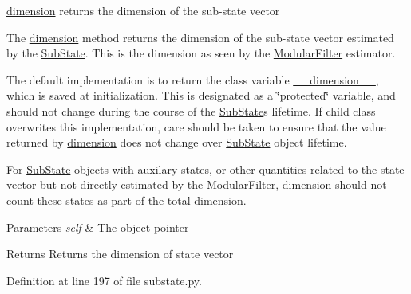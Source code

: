 \hyperlink{classmodest_1_1substates_1_1substate_1_1SubState_ab9027f6d1d7d57c47731612f519b7ee6}{dimension} returns the dimension of the sub-\/state vector 

The \hyperlink{classmodest_1_1substates_1_1substate_1_1SubState_ab9027f6d1d7d57c47731612f519b7ee6}{dimension} method returns the dimension of the sub-\/state vector estimated by the \hyperlink{classmodest_1_1substates_1_1substate_1_1SubState}{Sub\+State}. This is the dimension as seen by the \hyperlink{namespacemodest_1_1ModularFilter}{Modular\+Filter} estimator.

The default implementation is to return the class variable \hyperlink{classmodest_1_1substates_1_1substate_1_1SubState_a5b1c0756a69da7f293a415c7d2d77843}{\+\_\+\+\_\+dimension\+\_\+\+\_\+}, which is saved at initialization. This is designated as a \char`\"{}protected\char`\"{} variable, and should not change during the course of the \hyperlink{classmodest_1_1substates_1_1substate_1_1SubState}{Sub\+State}\textquotesingle{}s lifetime. If child class overwrites this implementation, care should be taken to ensure that the value returned by \hyperlink{classmodest_1_1substates_1_1substate_1_1SubState_ab9027f6d1d7d57c47731612f519b7ee6}{dimension} does not change over \hyperlink{classmodest_1_1substates_1_1substate_1_1SubState}{Sub\+State} object lifetime.

For \hyperlink{classmodest_1_1substates_1_1substate_1_1SubState}{Sub\+State} objects with auxilary states, or other quantities related to the state vector but not directly estimated by the \hyperlink{namespacemodest_1_1ModularFilter}{Modular\+Filter}, \hyperlink{classmodest_1_1substates_1_1substate_1_1SubState_ab9027f6d1d7d57c47731612f519b7ee6}{dimension} should not count these states as part of the total dimension.


\begin{DoxyParams}{Parameters}
{\em self} & The object pointer\\
\hline
\end{DoxyParams}
\begin{DoxyReturn}{Returns}
Returns the dimension of state vector 
\end{DoxyReturn}


Definition at line 197 of file substate.\+py.


